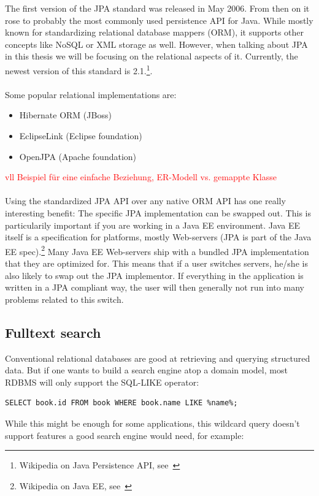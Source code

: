 The first version of the JPA standard was released in May 2006. From then on it rose to probably the most commonly used persistence API for Java. While mostly known for standardizing relational database mappers (ORM), it supports other concepts like NoSQL or XML storage as well. However, when talking about JPA in this thesis we will be focusing on the relational aspects of it. Currently, the newest version of this standard is 2.1.\footnote{Wikipedia on Java Persistence API, see~\cite{wiki_jpa}}.
\\\\
Some popular relational implementations are:
\begin{itemize}
	\item Hibernate ORM (JBoss)
	\item EclipseLink (Eclipse foundation)
	\item OpenJPA (Apache foundation)
\end{itemize}
\textcolor{red}{vll Beispiel für eine einfache Beziehung, ER-Modell vs. gemappte Klasse}
\\\\
Using the standardized JPA API over any native ORM API has one really interesting benefit:
The specific JPA implementation can be swapped out. This is particularily important if you are working in a Java EE environment. Java EE itself is a specification for platforms, mostly Web-servers (JPA is part of the Java EE spec).\footnote{Wikipedia on Java EE, see~\cite{wiki_java_ee}} Many Java EE Web-servers ship with a bundled JPA implementation that they are optimized for. This means that if a user switches servers, he/she is also likely to swap out the JPA implementor. If everything in the application is written in a JPA compliant way, the user will then generally not run into many problems related to this switch.

\subsection{Fulltext search}

Conventional relational databases are good at retrieving and querying structured data. But if one wants to build a search engine atop a domain model, most RDBMS will only support the SQL-LIKE operator:\\

\lstset{language=sql}
\begin{lstlisting}[frame=htrbl, label={lst:result2}]
SELECT book.id FROM book WHERE book.name LIKE %name%;
\end{lstlisting}
While this might be enough for some applications, this wildcard query doesn't support features a good search engine would need, for example:

